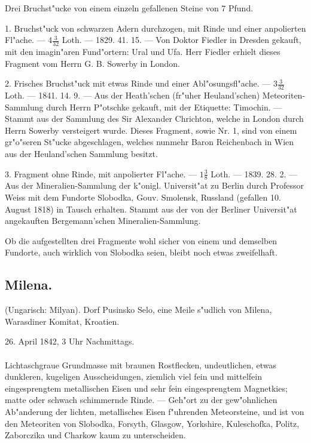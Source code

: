 \documentclass[a4paper, 11pt, oneside, polutonikogreek, german]{article}
\begin{document}
Drei Bruchst"ucke von einem einzeln gefallenen Steine von 7 Pfund.

1. Bruchst"uck von schwarzen Adern durchzogen, mit Rinde und einer anpolierten Fl"ache. --- $4\frac{3}{32}$ Loth. --- 1829. 41. 15. --- Von Doktor Fiedler in Dresden gekauft, mit den imagin"aren Fund"ortern: Ural und Ufa. Herr Fiedler erhielt dieses Fragment vom Herrn G. B. Sowerby in London.

2. Frisches Bruchst"uck mit etwas Rinde und einer Abl"osungsfl"ache. --- $3\frac{3}{32}$ Loth. --- 1841. 14. 9. --- Aus der Heath'schen (fr"uher Heuland'schen) Meteoriten-Sammlung durch Herrn P"otschke gekauft, mit der Etiquette: Timochin. --- Stammt aus der Sammlung des Sir Alexander Chrichton, welche in London durch Herrn Sowerby versteigert wurde. Dieses Fragment, sowie Nr. 1, sind von einem gr"o"seren St"ucke abgeschlagen, welches nunmehr Baron Reichenbach in Wien aus der Heuland'schen Sammlung besitzt.

3. Fragment ohne Rinde, mit anpolierter Fl"ache. --- $1\frac{3}{8}$ Loth. --- 1839. 28. 2. --- Aus der Mineralien-Sammlung der k"onigl. Universit"at zu Berlin durch Professor Weiss mit dem Fundorte Slobodka‚ Gouv. Smolensk, Russland (gefallen 10. August 1818) in Tausch erhalten. Stammt aus der von der Berliner Universit"at angekauften Bergemann’schen Mineralien-Sammlung.

Ob die aufgestellten drei Fragmente wohl sicher von einem und demselben Fundorte, auch wirklich von Slobodka seien, bleibt noch etwas zweifelhaft.
\subsection{Milena.}
\begin{center}
\small
(Ungarisch: Milyan). Dorf Pusinsko Selo, eine Meile s"udlich von Milena, Warasdiner Komitat, Kroatien.

26. April 1842, 3 Uhr Nachmittags.
\end{center}
\paragraph{}
Lichtaschgraue Grundmasse mit braunen Rostflecken, undeutlichen, etwas dunkleren, kugeligen Ausscheidungen, ziemlich viel fein und mittelfein eingesprengtem metallischen Eisen und sehr fein eingesprengtem Magnetkies; matte oder schwach schimmernde Rinde. --- Geh"ort zu der gew"ohnlichen Ab"anderung der lichten, metallisches Eisen f"uhrenden Meteorsteine, und ist von den Meteoriten von Slobodka, Forsyth, Glasgow, Yorkshire, Kuleschofka, Politz, Zaborczika und Charkow kaum zu unterscheiden.
\end{document}
